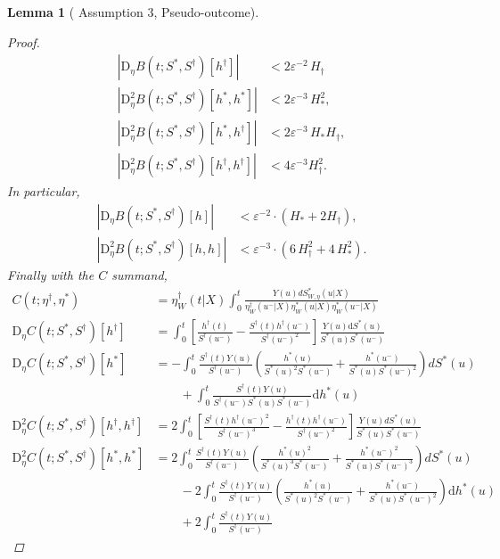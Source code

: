 \documentclass{article}
\newtheorem{lemma}[theorem]{Lemma}
\newcommand{\nd}{\mathrm{d}}
\newcommand{\bD}{\mathrm{D}}
\begin{document}
\begin{lemma}[\citet{foster2023orthogonal} Assumption 3, Pseudo-outcome]
\begin{proof}
\begin{align*}
|\bD_\eta B(t;S^*, S^\dagger)[h^\dagger]| &< 2\varepsilon^{-2}\,H_\dagger \\ 
|\bD^2_\eta B(t;S^*, S^\dagger)[h^*, h^*]| &< 2\varepsilon^{-3}\,H_\ast^2, \\
|\bD^2_\eta B(t;S^*, S^\dagger)[h^\ast, h^\dagger]| &< 2\varepsilon^{-3}\,H_\ast H_\dagger, \\ 
|\bD^2_\eta B(t;S^*, S^\dagger)[h^\dagger, h^\dagger]| &< 4\varepsilon^{-3} H_\dagger^2.
\end{align*}
In particular,
\begin{align*}
|\bD_\eta B(t;S^*, S^\dagger)[h]| &< \varepsilon^{-2} \cdot ( H_\ast + 2 H_\dagger), \\ 
|\bD^2_\eta B(t;S^*, S^\dagger)[h, h]| &< \varepsilon^{-3} \cdot ( 6\,H_\dagger^2 + 4\,H_*^2).
\end{align*}
Finally with the $C$ summand, 
\begin{align*}
C(t; \eta^\dagger, \eta^*) &= \eta_W^\dagger(t|X) \int_{0}^{t} \frac{Y(u)  dS^*_{W,\eta}(u|X)}{\eta_W^\dagger(u^-|X) \eta_W^\ast(u|X) \eta_W^\ast(u^-|X)}\\
\bD_\eta C(t;S^*, S^\dagger) [h^\dagger] &= 
\int_{0}^{t} \left[\frac{ h^\dagger(t)}{S^\dagger(u^-)} - \frac{S^\dagger(t) h^\dagger(u^-)}{S^\dagger(u^-)^2} \right] 
\frac{Y(u) \nd S^*(u)}{S^*(u)S^*(u^-)} \\ 
\bD_\eta C(t;S^*, S^\dagger) [h^\ast] &= 
- \int_{0}^{t} \frac{S^\dagger(t)Y(u)}{S^\dagger(u^-)} \left( \frac{h^\ast(u)}{S^\ast(u)^2 S^\ast(u^-)} +  \frac{h^\ast(u^-)}{S^\ast(u) S^\ast(u^-)^2} \right) dS^*(u)\\
& \qquad + \int_{0}^{t} \frac{S^\dagger(t) Y(u)}{S^\dagger(u^-) S^\ast(u) S^\ast(u^-)} \nd h^*(u) \\  
\bD^2_\eta C(t;S^*, S^\dagger) [h^\dagger, h^\dagger] &=  
2 \int_{0}^{t} \left[\frac{S^\dagger(t) h^\dagger(u^-)^2}{S^\dagger(u^-)^3 } -  
\frac{h^\dagger(t) h^\dagger(u^-)}{S^\dagger(u^-)^2 } \right] \frac{Y(u)dS^*(u)}{S^*(u)S^*(u^-)} \\
\bD^2_\eta C(t;S^*, S^\dagger) [h^\ast, h^\ast] &=  
2\int_{0}^{t} \frac{S^\dagger(t)Y(u)}{S^\dagger(u^-)} \left(  
  \frac{h^\ast(u)^2}{S^\ast(u)^3 S^\ast(u^-)} 
  + \frac{h^\ast(u^-)^2}{S^\ast(u) S^\ast(u^-)^3} \right) dS^\ast(u)\\ 
& \qquad - 2 \int_0^t \frac{S^\dagger(t)Y(u)}{S^\dagger(u^-)} \left(
  \frac{h^\ast(u)}{S^\ast(u)^2 S^\ast(u^-)} 
  + \frac{h^\ast(u^-)}{S^\ast(u) S^\ast(u^-)^2} \right) \nd h^\ast(u)\\ 
& \qquad + 2 \int_0^t \frac{S^\dagger(t)Y(u)}{S^\dagger(u^-)}

\end{align*}
\end{proof}
\end{lemma}
\end{document}
